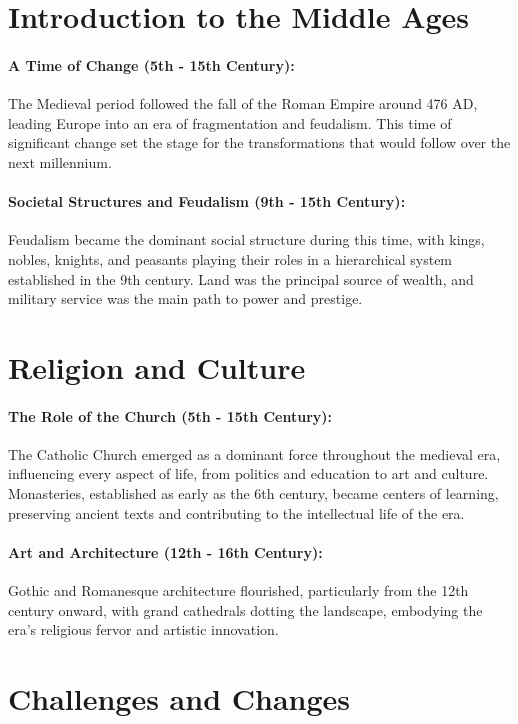 \documentclass{book}
\begin{document}
\section*{Introduction to the Middle Ages}

\paragraph{A Time of Change (5th - 15th Century):}
The Medieval period followed the fall of the Roman Empire around 476 AD, leading Europe into an era of fragmentation and feudalism. This time of significant change set the stage for the transformations that would follow over the next millennium.

\paragraph{Societal Structures and Feudalism (9th - 15th Century):}
Feudalism became the dominant social structure during this time, with kings, nobles, knights, and peasants playing their roles in a hierarchical system established in the 9th century. Land was the principal source of wealth, and military service was the main path to power and prestige.

\section*{Religion and Culture}

\paragraph{The Role of the Church (5th - 15th Century):}
The Catholic Church emerged as a dominant force throughout the medieval era, influencing every aspect of life, from politics and education to art and culture. Monasteries, established as early as the 6th century, became centers of learning, preserving ancient texts and contributing to the intellectual life of the era.

\paragraph{Art and Architecture (12th - 16th Century):}
Gothic and Romanesque architecture flourished, particularly from the 12th century onward, with grand cathedrals dotting the landscape, embodying the era’s religious fervor and artistic innovation.

\section*{Challenges and Changes}
\end{document}
